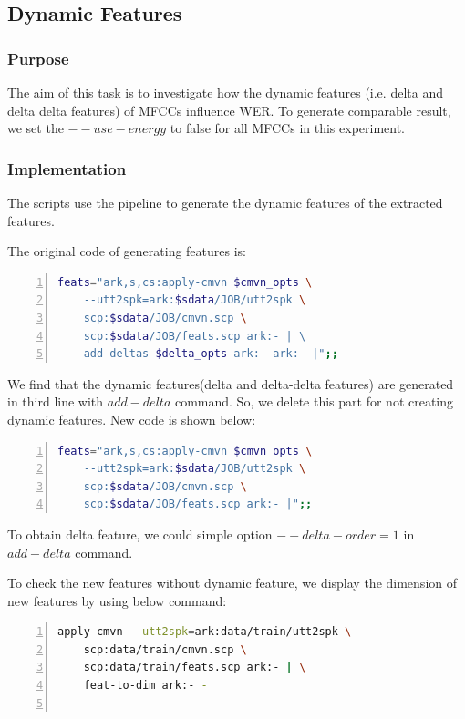 \documentclass[]{article}
\begin{document}
\begin{multicols*}{2}
\subsection{Dynamic Features}
\subsubsection{Purpose}
The aim of this task is to investigate how the dynamic features (i.e. delta and delta delta features) of MFCCs influence WER. To generate comparable result, we set the $--use-energy$ to false for all MFCCs in this experiment.

\subsubsection{Implementation}
The scripts use the pipeline to generate the dynamic features of the extracted features. 

The original code of generating features is:

\begin{lstlisting}[language=sh,showstringspaces=false,numbers=left, title=\lstname{Creating dynamic feature with pipeline method},tabsize=4, xleftmargin=\parindent, basicstyle=\tiny, frame=single] 
feats="ark,s,cs:apply-cmvn $cmvn_opts \
	--utt2spk=ark:$sdata/JOB/utt2spk \
	scp:$sdata/JOB/cmvn.scp \
	scp:$sdata/JOB/feats.scp ark:- | \ 
	add-deltas $delta_opts ark:- ark:- |";;
\end{lstlisting} 

We find that the dynamic features(delta and delta-delta features) are generated in third line with $add-delta$ command. So, we delete this part for not creating dynamic features. New code is shown below:

\begin{lstlisting}[language=sh,showstringspaces=false,numbers=left, tabsize=4, xleftmargin=\parindent, basicstyle=\tiny, frame=single] 
feats="ark,s,cs:apply-cmvn $cmvn_opts \
	--utt2spk=ark:$sdata/JOB/utt2spk \
	scp:$sdata/JOB/cmvn.scp \
	scp:$sdata/JOB/feats.scp ark:- |";;
\end{lstlisting} 

To obtain delta feature, we could simple option $--delta-order=1$ in $add-delta$ command. 

To check the new features without dynamic feature, we display the dimension of new features by using below command:

\begin{lstlisting}[language=sh,showstringspaces=false,numbers=left,tabsize=4, xleftmargin=\parindent, frame=single, basicstyle=\tiny] 
apply-cmvn --utt2spk=ark:data/train/utt2spk \ 
	scp:data/train/cmvn.scp \
	scp:data/train/feats.scp ark:- | \
	feat-to-dim ark:- -
	

\end{lstlisting}
\end{multicols*}
\end{document}
